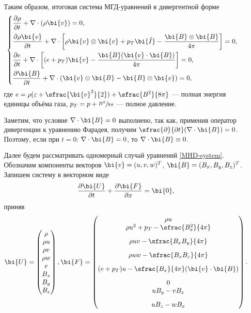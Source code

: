 \documentclass[12pt, a4paper]{article}
\begin{document}
	Таким образом, итоговая система МГД-уравнений в дивергентной форме
	\begin{equation}
	\label{MHD-system}
	 \begin{cases}
	 	\dfrac{\partial\rho}{\partial t} + \nabla \cdot (\rho \bi{v})   = 0, \\[3mm]
	 	\dfrac{\partial \rho \bi{v}}{\partial t} + \nabla\cdot\left[\rho\bi{v}\otimes\bi{v} + p_T \bi{\hat{I}} - \dfrac{\bi{B}\otimes\bi{B}}{4\pi}\right] = 0, \\[3mm]
	 	\dfrac{\partial e}{\partial t} + \nabla\cdot \left[(e+p_T)\bi{v} - \dfrac{\bi{B}(\bi{v}\cdot\bi{B})}{4\pi}\right] = 0, \\[3mm]
	 		\dfrac{\partial \bi{B}}{\partial t} + \nabla \cdot (\bi{v}\otimes\bi{B}-\bi{B}\otimes\bi{v}) = 0,
	 \end{cases}
	\end{equation} 
	где $e = \rho(\varepsilon + \sfrac{\bi{v}^2}{2})+\sfrac{B^2}{8\pi}$ --- полная энергия единицы объёма газа, $p_T = p + \sfrac{B^2}{8\pi}$ --- полное давление.
	
	Заметим, что условие $\nabla \cdot \bi{B} =0$ выполнено, так как, применив оператор дивергенции к уравнению Фарадея, получим $\sfrac{\partial}{\partial t} (\nabla \cdot \bi{B}) = 0$. Поэтому, если при $t=0$: $\nabla\cdot\bi{B}=0$, то $\nabla\cdot\bi{B}\equiv0$.
	
	Далее будем рассматривать одномерный случай уравнений \eqref{MHD-system}. Обозначим компоненты векторов $\bi{v} = (u, v, w)^T$, $\bi{B} = (B_x, B_y, B_z)^T$. Запишем систему в векторном виде 
	\begin{equation}
	\label{vectorMHD}
	\dfrac{\partial \bi{U}}{\partial t} + \dfrac{\partial \bi{F}}{\partial x} = \bi{0},
	\end{equation}
	приняв
	\[
	\bi{U} = \begin{pmatrix}\rho \\ \rho u \\ \rho v \\ \rho w \\ e \\ B_x \\ B_y \\ B_z \end{pmatrix},
	\bi{F}=\begin{pmatrix} \rho u \\ 
					\rho u^2 + p_T - \sfrac{B_x^2}{4\pi} \\[3mm] 
					\rho uv - \sfrac{B_x B_y}{4\pi} \\[3mm] 
					\rho uw - \sfrac{B_x B_z}{4\pi} \\[3mm]
					(e+p_T)u - \sfrac{B_x }{4\pi}(\bi{v}\cdot\bi{B}) \\[3mm]
					0\\
					uB_y - vB_x \\[3mm]
					uB_z - wB_x  
			\end{pmatrix}.
	\]
	\pagebreak
	
\end{document}
